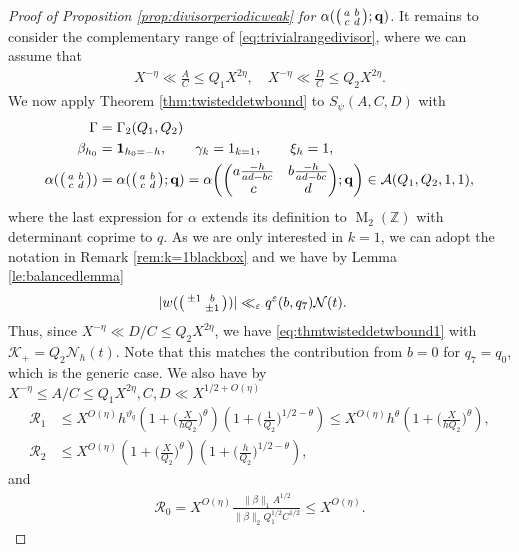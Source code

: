 \documentclass[12pt]{amsart}
\theoremstyle{definition}
\theoremstyle{remark}
\numberwithin{equation}{section}
\newcommand{\Z}{{\mathbb Z}}
\newcommand{\1}{{\mathbf 1}}
\newcommand{\eps}{\varepsilon}
\newcommand{\MM}{\operatorname{M}}
\renewcommand{\c}{\mathfrak c}
\begin{document}
\begin{proof}[Proof of Proposition \ref{prop:divisorperiodicweak} for $ \alpha(\smqty(a & b \\c & d);\mathbf{q})$]
It remains to consider the complementary range of \eqref{eq:trivialrangedivisor}, where we can assume that
\begin{align} \label{eq:complementaryrange}
    X^{-\eta}\ll \frac{A}{C} \leq Q_1 X^{2\eta}, \quad X^{-\eta} \ll \frac{D}{C} \leq  Q_2 X^{2\eta} .
\end{align}
We now apply Theorem \ref{thm:twisteddetwbound} to $ S_{\psi}(A,C,D) $ with  
\begin{align*}
\Gamma &= \Gamma_2(Q_1,Q_2)\\
    \beta_{h_0}&=\mathbf{1}_{h_0=-h}, \quad \quad \gamma_k=1_{k=1}, \quad \quad \xi_h=1, \\
   \alpha(\smqty(a& b \\ c & d)) &= \alpha(\smqty(a & b \\c & d);\mathbf{q}) =  \alpha\bigg(\mqty(a\frac{-h}{ad-bc} & b\frac{-h}{ad-bc} \\c & d);\mathbf{q}\bigg) \in \mathcal{A}(Q_1,Q_2,1,1), 
\end{align*}
where the last expression for $\alpha$ extends its definition to  $\MM_2(\Z)$ with determinant coprime to $q$. As we are only interested in $k=1$, we can adopt the notation in Remark \ref{rem:k=1blackbox} and we have by Lemma \ref{le:balancedlemma}
\begin{align*}
    |w(\smqty( \pm 1 & b \\ & \pm 1))|&\ll_\eps   q^\eps (b,q_7) \mathcal{N}(t).
\end{align*}
Thus, since $X^{-\eta} \ll D/C \leq  Q_2 X^{2\eta}$, we have \eqref{eq:thmtwisteddetwbound1} with $ \mathcal{K}_+ =    Q_2 \mathcal{N}_h(t)$. Note that this matches the contribution from $b=0$ for $q_7=q_0$, which is the generic case.
We also have by $X^{-\eta} \leq A/C \leq  Q_1 X^{2\eta}, C,D \ll X^{1/2+O(\eta)}$
\begin{align*}
    \mathcal{R}_1&\leq X^{O(\eta)} h^{\vartheta_q}\left(1+\bigg(\frac{X}{h  Q_2 }\bigg)^{\theta} \right)\left(1+ \bigg(\frac{1}{  Q_2}\bigg)^{1/2-\theta}\right)\leq X^{O(\eta)}  h^{\theta}\left(1+\bigg(\frac{X}{h  Q_2 }\bigg)^{\theta} \right), \\
    \mathcal{R}_2&\leq   X^{O(\eta)} \left(1+\bigg(\frac{ X}{ Q_2}\bigg)^{\theta} \right)\left(1+ \bigg(\frac{h }{ Q_2 }\bigg)^{1/2-\theta}\right),
\end{align*}
and
\begin{align*}
   \mathcal{R}_0 = X^{O(\eta)} \frac{ \|\beta\|_1  A^{1/2} }{\|\beta\|_2   Q_1^{1/2} C^{1/2}}\leq 
   X^{O(\eta)} .
\end{align*}

\end{proof}
\end{document}
